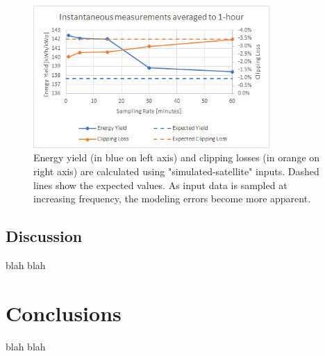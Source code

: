 \documentclass[conference]{IEEEtran}
\begin{document}
\begin{figure}[htbp]
\centerline{\includegraphics[width=9cm]{satellite-simulated.png}}
\caption{Energy yield (in blue on left axis) and clipping losses (in orange on right axis) are calculated using "simulated-satellite" inputs. Dashed lines show the expected values. As input data is sampled at increasing frequency, the modeling errors become more apparent.}
\label{fig:satellite-simulated}
\end{figure}


\subsection{Discussion}
blah blah

\section{Conclusions}
blah blah



\end{document}
